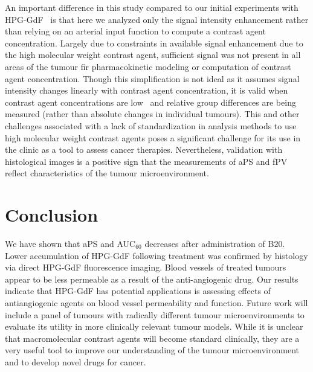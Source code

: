 An important difference in this study compared to our initial experiments with \acs{HPG-GdF}~\cite{Baker:2015coa} is that here we analyzed only the signal intensity enhancement rather than relying on an arterial input function to compute a contrast agent concentration.
Largely due to constraints in available signal enhancement due to the high molecular weight contrast agent, sufficient signal was not present in all areas of the tumour fir pharmacokinetic modeling or computation of contrast agent concentration.
Though this simplification is not ideal as it assumes signal intensity changes linearly with contrast agent concentration, it is valid when contrast agent concentrations are low~\cite{Heilmann:2006bm} and relative group differences are being measured (rather than absolute changes in individual tumours).
This and other challenges associated with a lack of standardization in analysis methods to use high molecular weight contrast agents poses a significant challenge for its use in the clinic as a tool to assess cancer therapies. 
Nevertheless, validation with histological images is a positive sign that the measurements of \acs{aPS} and \acs{fPV} reflect characteristics of the tumour microenvironment.

\section{Conclusion}

We have shown that \acs{aPS} and \acs{AUC}$_{60}$ decreases after administration of B20.
Lower accumulation of \acs{HPG-GdF} following treatment was confirmed by histology via direct \acs{HPG-GdF} fluorescence imaging.
Blood vessels of treated tumours appear to be less permeable as a result of the anti-angiogenic drug.
Our results indicate that \acs{HPG-GdF} has potential applications is assessing effects of antiangiogenic agents on blood vessel permeability and function.
Future work will include a panel of tumours with radically different tumour microenvironments to evaluate its utility in more clinically relevant tumour models.
While it is unclear that macromolecular contrast agents will become standard clinically, they are a very useful tool to improve our understanding of the tumour microenvironment and to develop novel drugs for cancer.
\endinput